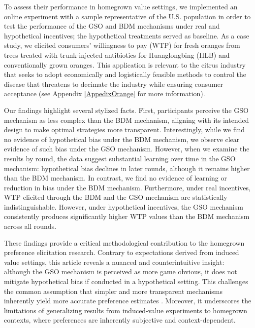 \documentclass[12pt]{article}
\begin{document}
To assess their performance in homegrown value settings, we implemented an online experiment with a sample representative of the U.S. population in order to test the performance of the GSO and BDM mechanisms under real and hypothetical incentives; the hypothetical treatments served as baseline. As a case study, we elicited consumers' willingness to pay (WTP) for fresh oranges from trees treated with trunk-injected antibiotics for Huanglongbing (HLB) and conventionally grown oranges. This application is relevant to the citrus industry that seeks to adopt economically and logistically feasible methods to control the disease that threatens to decimate the industry while ensuring consumer acceptance (see Appendix \ref{AppedixOrange} for more information). 

Our findings highlight several stylized facts. First, participants perceive the GSO mechanism as less complex than the BDM mechanism, aligning with its intended design to make optimal strategies more transparent. Interestingly, while we find no evidence of hypothetical bias under the BDM mechanism, we observe clear evidence of such bias under the GSO mechanism. However, when we examine the results by round, the data suggest substantial learning over time in the GSO mechanism: hypothetical bias declines in later rounds, although it remains higher than the BDM mechanism. In contrast, we find no evidence of learning or reduction in bias under the BDM mechanism.
Furthermore, under real incentives, WTP elicited through the BDM and the GSO mechanism are statistically indistinguishable. However, under hypothetical incentives, the GSO mechanism consistently produces significantly higher WTP values than the BDM mechanism across all rounds.

These findings provide a critical methodological contribution to the homegrown preference elicitation research. Contrary to expectations derived from induced value settings, this article reveals a nuanced and counterintuitive insight: although the GSO mechanism is perceived as more game obvious, it does not mitigate hypothetical bias if conducted in a hypothetical setting. This challenges the common assumption that simpler and more transparent mechanisms inherently yield more accurate preference estimates \citep{li_obviously_2017}. Moreover, it underscores the limitations of generalizing results from induced-value experiments to homegrown contexts, where preferences are inherently subjective and context-dependent.
\end{document}
